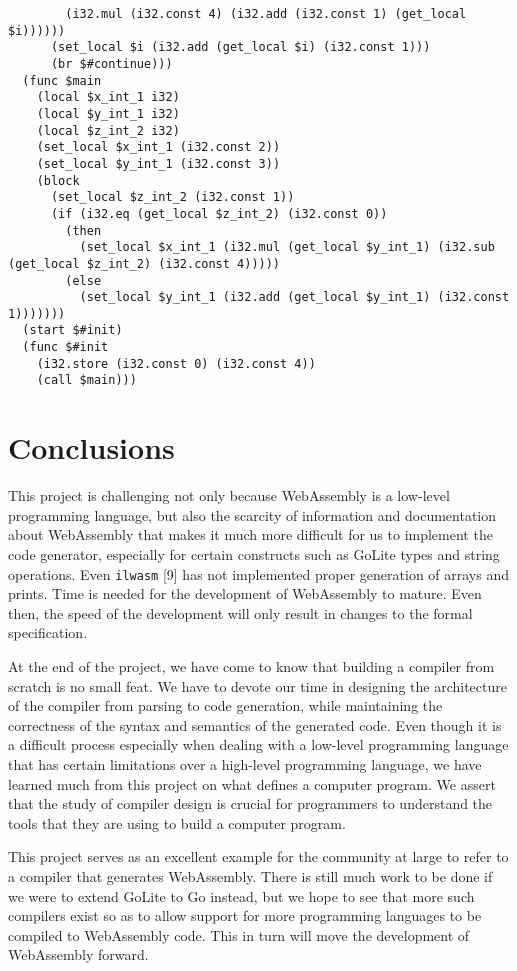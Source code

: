 \documentclass{article}
\begin{document}
\begin{lstlisting}
        (i32.mul (i32.const 4) (i32.add (i32.const 1) (get_local $i))))))
      (set_local $i (i32.add (get_local $i) (i32.const 1)))
      (br $#continue)))
  (func $main
    (local $x_int_1 i32)
    (local $y_int_1 i32)
    (local $z_int_2 i32)
    (set_local $x_int_1 (i32.const 2))
    (set_local $y_int_1 (i32.const 3))
    (block
      (set_local $z_int_2 (i32.const 1))
      (if (i32.eq (get_local $z_int_2) (i32.const 0))
        (then
          (set_local $x_int_1 (i32.mul (get_local $y_int_1) (i32.sub (get_local $z_int_2) (i32.const 4)))))
        (else
          (set_local $y_int_1 (i32.add (get_local $y_int_1) (i32.const 1)))))))
  (start $#init)
  (func $#init
    (i32.store (i32.const 0) (i32.const 4))
    (call $main)))
\end{lstlisting}

\section{Conclusions}
This project is challenging not only because WebAssembly is a low-level programming language, but also the scarcity of information and documentation about WebAssembly that makes it much more difficult for us to implement the code generator, especially for certain constructs such as GoLite types and string operations. Even \verb|ilwasm| [9] has not implemented proper generation of arrays and prints. Time is needed for the development of WebAssembly to mature. Even then, the speed of the development will only result in changes to the formal specification.

At the end of the project, we have come to know that building a compiler from scratch is no small feat. We have to devote our time in designing the architecture of the compiler from parsing to code generation, while maintaining the correctness of the syntax and semantics of the generated code. Even though it is a difficult process especially when dealing with a low-level programming language that has certain limitations over a high-level programming language, we have learned much from this project on what defines a computer program. We assert that the study of compiler design is crucial for programmers to understand the tools that they are using to build a computer program.

This project serves as an excellent example for the community at large to refer to a compiler that generates WebAssembly. There is still much work to be done if we were to extend GoLite to Go instead, but we hope to see that more such compilers exist so as to allow support for more programming languages to be compiled to WebAssembly code. This in turn will move the development of WebAssembly forward.
\end{document}
